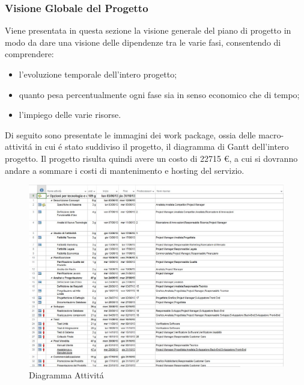 \subsubsection{Visione Globale del Progetto}
Viene presentata in questa sezione la visione generale del piano di progetto in modo da
dare una visione delle dipendenze tra le varie fasi, consentendo di comprendere:
\begin{itemize}
\item l'evoluzione temporale dell'intero progetto;
\item quanto pesa percentualmente ogni fase sia in senso economico che di tempo;
\item l'impiego delle varie risorse.
\end{itemize}
Di seguito sono presentate le immagini dei work package, ossia delle macro-attivit\'a in cui
\'e stato suddiviso il progetto, il diagramma di Gantt dell'intero progetto.
Il progetto risulta quindi avere un costo di 22715 \euro{}, a cui si dovranno andare a
sommare i costi di mantenimento e hosting del servizio.

\begin{figure}[H]
\begin{center}
\includegraphics[width=1\textwidth]{img/Attivita.jpg}
\caption{Diagramma  Attivit\'a}
\label{fig:Diagramma Attivit\'a}
\end{center}
\end{figure}

